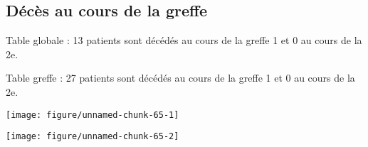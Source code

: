 \documentclass[11pt,a4paper]{article}\usepackage[]{graphicx}\usepackage[]{color}
\makeatletter
\def\maxwidth{ %
  \ifdim\Gin@nat@width>\linewidth
    \linewidth
  \else
    \Gin@nat@width
  \fi
}
\newenvironment{knitrout}{}{} %
\makeatother
\begin{document}
  \subsection{Décès au cours de la greffe}

Table globale : 13 patients sont décédés au cours de la greffe 1 et 0 au cours de la 2e.

Table greffe : 27 patients sont décédés au cours de la greffe 1 et 0 au cours de la 2e.

\begin{knitrout}
\color{fgcolor}
\texttt{[image: figure/unnamed-chunk-65-1]} 

\texttt{[image: figure/unnamed-chunk-65-2]} 

\end{knitrout}
\end{document}
